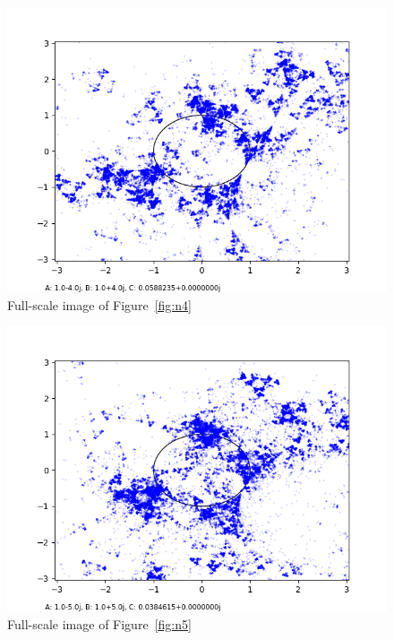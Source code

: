 \documentclass[12pt,a4paper,reqno,parskip=full]{amsart}
\numberwithin{equation}{section}
\theoremstyle{plain}
\theoremstyle{definition}
\begin{document}
\begin{figure}[H]
    \centering
    \includegraphics[width=\textwidth]{images/nn/a-4 b4 h30 d0.01.png}
    \caption{Full-scale image of Figure~\ref{fig:n4}}
\end{figure}

\begin{figure}[H]
    \centering
    \includegraphics[width=\textwidth]{images/nn/a-5 b5 h30 d0.01.png}
    \caption{Full-scale image of Figure~\ref{fig:n5}}
\end{figure}
\end{document}
